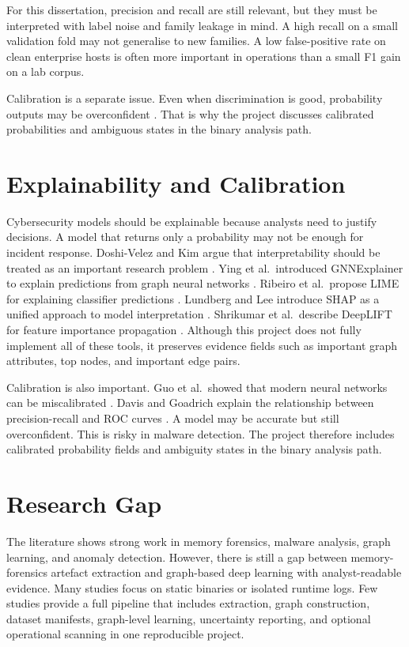 For this dissertation, precision and recall are still relevant, but they must be interpreted with label noise and family leakage in mind. A high recall on a small validation fold may not generalise to new families. A low false-positive rate on clean enterprise hosts is often more important in operations than a small F1 gain on a lab corpus.

Calibration is a separate issue. Even when discrimination is good, probability outputs may be overconfident \cite{guo2017calibration}. That is why the project discusses calibrated probabilities and ambiguous states in the binary analysis path.

\section{Explainability and Calibration}

Cybersecurity models should be explainable because analysts need to justify decisions. A model that returns only a probability may not be enough for incident response. Doshi-Velez and Kim argue that interpretability should be treated as an important research problem \cite{doshi2017interpretable}. Ying et al.\ introduced GNNExplainer to explain predictions from graph neural networks \cite{ying2019gnnexplainer}. Ribeiro et al.\ propose LIME for explaining classifier predictions \cite{ribeiro2016why}. Lundberg and Lee introduce SHAP as a unified approach to model interpretation \cite{lundberg2017shap}. Shrikumar et al.\ describe DeepLIFT for feature importance propagation \cite{shrikumar2017deeplift}. Although this project does not fully implement all of these tools, it preserves evidence fields such as important graph attributes, top nodes, and important edge pairs.

Calibration is also important. Guo et al.\ showed that modern neural networks can be miscalibrated \cite{guo2017calibration}. Davis and Goadrich explain the relationship between precision-recall and ROC curves \cite{davis2006roc}. A model may be accurate but still overconfident. This is risky in malware detection. The project therefore includes calibrated probability fields and ambiguity states in the binary analysis path.

\section{Research Gap}

The literature shows strong work in memory forensics, malware analysis, graph learning, and anomaly detection. However, there is still a gap between memory-forensics artefact extraction and graph-based deep learning with analyst-readable evidence. Many studies focus on static binaries or isolated runtime logs. Few studies provide a full pipeline that includes extraction, graph construction, dataset manifests, graph-level learning, uncertainty reporting, and optional operational scanning in one reproducible project.

